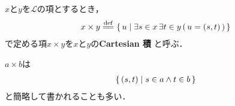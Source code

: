 	\begin{screen}
		\begin{dfn}[Cartesian積]
			$x$と$y$を$\mathcal{L}$の項とするとき，
			\begin{align}
				x \times y \defeq 
				\Set{u}{\exists s \in x\, \exists t \in y\, (\, u=(s,t)\, )}
			\end{align}
			で定める項$x \times y$を$x$と$y$の{\bf Cartesian 積}
			と呼ぶ．
		\end{dfn}
	\end{screen}
	
	$a \times b$は
	\begin{align}
		\left\{\, (s,t) \mid s \in a \wedge t \in b\, \right\} 
	\end{align}
	と簡略して書かれることも多い．
	
	\begin{comment}
	\monologue{
		院生「類$a$と類$b$のCartesian 積は
			\begin{align}
				a \times b = \Set{(s,t)}{s \in a \wedge t \in b} 
			\end{align}
			と簡略して書かれることも多いです．ところで他の本やネットなどを見ていると
			Cartesian 積を直積とも呼んでいるそうです．本稿でも後で直積というものを定義いたしますが，
			本稿ではCartesian 積と直積を明確に区別いたします．
			これは巷にあふれる直積の定義の不自然さを解消するためです．
			どういう点が不自然であるか簡単に説明いたしましょう．
			まだ有限とか数だとか定義していませんが，説明の便宜のために使用いたします．
			よく見る直積の定義だと，有限か有限でないかで直積の定め方が変わります．
			\begin{align}
				I_1 \times I_2 \times \cdots \times I_n 
				= \Set{(x_1,x_2,\cdots,x_n)}{x_1 \in I_1 \wedge x_2 \in I_2 \wedge
				\cdots \wedge x_n \in I_n}
			\end{align}
			そして
			\begin{align}
				I_1 \times I_2 \times \cdots \times I_n 
				= \prod_{i=1}^n I_i
			\end{align}
			と書いている．ここで
			$\prod_{i=1}^n I_i$は$\prod_{i\in\{1,2,\cdots,n\}} I_i$の別の記法です．
			他方$I$を$\{1,2,\cdots,n\}$から$V$への写像と見ることもできますから
			\begin{align}
				\prod_{i=1}^n I_i = \Set{f}{f:\{1,2,\cdots,n\} \longrightarrow V \wedge \forall i \in \{1,2,\cdots,n\}\ (\ f(i) \in I_i\ )}
			\end{align}
			となるはずです．食い違います．
			」
	}
	\end{comment}
	
